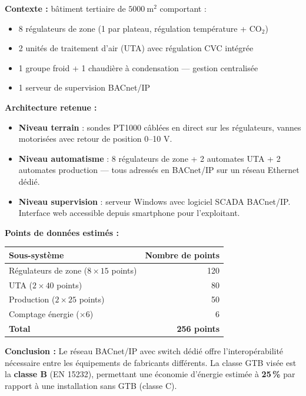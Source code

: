 \begin{exemple}[title={Dimensionnement d'un réseau GTB BACnet/IP}]
  \textbf{Contexte :} bâtiment tertiaire de $\SI{5000}{\metre\squared}$ comportant :
  \begin{itemize}
    \item 8 régulateurs de zone (1 par plateau, régulation température + CO$_2$)
    \item 2 unités de traitement d'air (UTA) avec régulation CVC intégrée
    \item 1 groupe froid + 1 chaudière à condensation — gestion centralisée
    \item 1 serveur de supervision BACnet/IP
  \end{itemize}

  \textbf{Architecture retenue :}
  \begin{itemize}
    \item \textbf{Niveau terrain} : sondes PT1000 câblées en direct sur les régulateurs, vannes motorisées avec retour de position 0–10 V.
    \item \textbf{Niveau automatisme} : 8 régulateurs de zone + 2 automates UTA + 2 automates production — tous adressés en BACnet/IP sur un réseau Ethernet dédié.
    \item \textbf{Niveau supervision} : serveur Windows avec logiciel SCADA BACnet/IP. Interface web accessible depuis smartphone pour l'exploitant.
  \end{itemize}

  \textbf{Points de données estimés :}
  \begin{center}
  \begin{tabular}{lr}
    \toprule
    Sous-système & Nombre de points \\
    \midrule
    Régulateurs de zone ($8 \times 15$ points) & 120 \\
    UTA ($2 \times 40$ points) & 80 \\
    Production ($2 \times 25$ points) & 50 \\
    Comptage énergie ($\times 6$) & 6 \\
    \textbf{Total} & \textbf{256 points} \\
    \bottomrule
  \end{tabular}
  \end{center}

  \textbf{Conclusion :} Le réseau BACnet/IP avec switch dédié offre l'interopérabilité nécessaire entre les équipements de fabricants différents. La classe GTB visée est la \textbf{classe B} (EN 15232), permettant une économie d'énergie estimée à \textbf{25\,\%} par rapport à une installation sans GTB (classe C).
\end{exemple}


